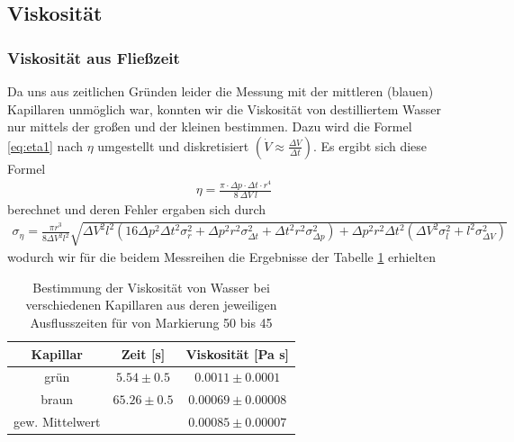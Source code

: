 \documentclass[12pt,a4paper,titlepage,headinclude,bibtotoc]{scrartcl}
\begin{document}
\subsection{Viskosität}
\subsubsection{Viskosität aus Fließzeit}
Da uns aus zeitlichen Gründen leider die Messung mit der mittleren (blauen) Kapillaren unmöglich war, konnten wir die Viskosität von destilliertem Wasser nur mittels der großen und der kleinen bestimmen.
Dazu wird die Formel \eqref{eq:eta1} nach $\eta$ umgestellt und diskretisiert $(\dot{V}\approx \frac{\Delta V}{\Delta t})$. Es ergibt sich diese Formel
\begin{align}
	\eta=\frac{\pi \cdot \Delta p \cdot \Delta t \cdot r^{4}}{8 ~ \Delta V~ l}
\end{align}
berechnet und deren Fehler ergaben sich durch
\begin{align*}
 \sigma_{\eta}=\frac{\pi r^{3}}{8  \Delta V^{2} l^{2}} \sqrt{ \Delta V^{2} l^{2} \left(16 \Delta p^{2} \Delta t^{2} \sigma_{r}^{2} + \Delta p^{2} r^{2} \sigma_{\Delta t}^{2} + \Delta t^{2} r^{2} \sigma_{\Delta p}^{2}\right) +\Delta p^{2}r^{2}\Delta t^{2} \left(\Delta V^{2}   \sigma_{l}^{2} + l^{2} \sigma_{\Delta V}^{2}\right)}\label{eq:sigmaeta}
\end{align*}
wodurch wir für die beidem Messreihen die Ergebnisse der Tabelle \ref{tbl:viskozeit} erhielten
\begin{table}[!h]
 \centering
 \begin{tabular}{|c|c|c|}
  \hline
  Kapillar & Zeit [s] & Viskosität [Pa s]\\\hline
  grün & $5.54\pm 0.5$ & $0.0011\pm 0.0001$\\
  braun & $65.26\pm 0.5$&$0.00069\pm 0.00008$\\\hline
  gew. Mittelwert & & $0.00085\pm 0.00007$\\\hline
 \end{tabular}
 \caption{Bestimmung der Viskosität von Wasser bei verschiedenen Kapillaren aus deren jeweiligen Ausflusszeiten für von Markierung 50 bis 45\label{tbl:viskozeit}}
\end{table}
\end{document}

